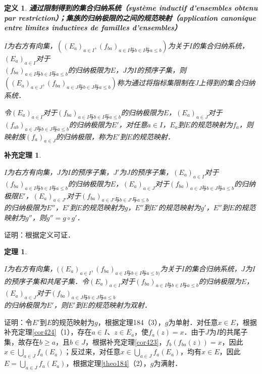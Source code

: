 \documentclass[12pt, a4paper, oneside]{book}
\newtheorem{theo}{定理}
\newtheorem{cor}{补充定理}
\newtheorem{de}{定义}
\begin{document}
			\begin{de}
				\textbf{通过限制得到的集合归纳系统（système inductif d'ensembles obtenu par restriction）；集族的归纳极限的之间的规范映射（application canonique entre limites inductives de familles d'ensembles）}
				\par
				$I$为右方有向集，$((E_a)_{a\in I}, (f_{ba})_{a\in I\text{与}b\in I\text{与}a\leq b})$为关于$I$的集合归纳系统，$(E_a)_{a\in I}$对于\\$(f_{ba})_{a\in I\text{与}b\in I\text{与}a\leq b}$的归纳极限为$E$，$J$为$I$的预序子集，则$((E_a)_{a\in J}, (f_{ba})_{a\in J\text{与}b\in J\text{与}a\leq b})$称为通过将指标集限制在J上得到的集合归纳系统．
				\par
				令$(E_a)_{a\in I}$对于$(f_{ba})_{a\in I\text{与}b\in I\text{与}a\leq b}$的归纳极限为$E$，$(E_a)_{a\in J}$对于$(f_{ab})_{a\in J\text{与}b\in J\text{与}a\leq b}$的归纳极限为$E'$，对任意$a\in I$，$E_a$到$E$的规范映射为$f_a$，则映射族$(f_a)_{a\in J}$的归纳极限，称为$E'$到$E$的规范映射．
			\end{de}
			
			\begin{cor}\label{cor430}
				\hfill\par
				$I$为右方有向集，$J$为$I$的预序子集，$J'$为$J$的预序子集，$(E_a)_{a\in I}$对于$(f_{ba})_{a\in I\text{与}b\in I\text{与}a\leq b}$的归纳极限为$E$，$(E_a)_{a\in J}$对于$(f_{ba})_{a\in J\text{与}b\in J\text{与}a\leq b}$的归纳极限$E'$，$(E_a)_{a\in J'}$对于$(f_{ba})_{a\in J'\text{与}b\in J'\text{与}a\leq b}$\\的归纳极限为$E''$，$E'$到$E$的规范映射为$g$，$E''$到$E'$的规范映射为$g'$，$E''$到$E$的规范映射为$g''$，则$g''=g\circ g'$．
			\end{cor}
			证明：根据定义可证．	
					
			\begin{theo}\label{theo189}
				\hfill\par
				$I$为右方有向集，$((E_a)_{a\in I}, (f_{ba})_{a\in I\text{与}b\in I\text{与}a\leq b)}$为关于$I$的集合归纳系统，$J$为$I$的预序子集和共尾子集．令$(E_a)_{a\in I}$对于$(f_{ba})_{a\in I\text{与}b\in I\text{与}a\leq b}$的归纳极限为$E$，$(E_a)_{a\in J}$对于$(f_{ba})_{a\in J\text{与}b\in J\text{与}a\leq b}$\\的归纳极限为$E'$，则$E'$到$E$的规范映射为双射．
			\end{theo}
			证明：令$E'$到$E$的规范映射为$g$，根据定理184（3），$g$为单射．对任意$x\in E$，根据补充定理\ref{cor424}（1），存在$a\in I$、$z\in E_a$，使$f_a(z)=x$．由于$J$为$I$的共尾子集，故存在$b\geq a$，且$b\in J$，根据补充定理\ref{cor423}，$f_b(f_{ba}(z))=x$，因此$x\in \bigcup\limits_{a\in J}f_a(E_a)$；反过来，对任意$x\in \bigcup\limits_{a\in J}f_a(E_a)$，均有$x\in E$，因此$E=\bigcup\limits_{a\in J}f_a(E_a)$，根据定理\ref{theo184}（2），$g$为满射．
						
\end{document}
